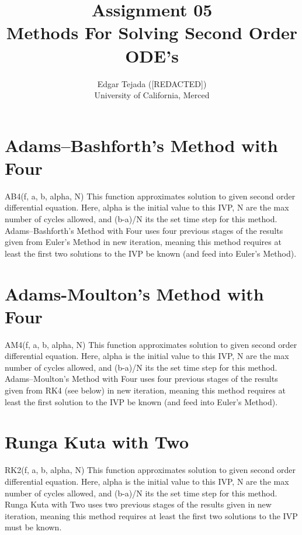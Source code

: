 \documentclass [12pt]{article}
\title{Assignment 05 \\\medskip Methods For Solving Second Order ODE's}
\author{Edgar Tejada ([REDACTED])\\University of California, Merced}
\begin{document}
\maketitle

\newpage
\section{Adams–Bashforth's Method with Four}
\indent AB4(f, a, b, alpha, N)
\indent \indent This function approximates solution to given second order differential equation. Here, alpha is the initial value to this IVP, N are the max number of cycles allowed, and (b-a)/N its the set time step for this method. Adams–Bashforth's Method with Four uses four previous stages of the results given from Euler's Method in new iteration, meaning this method requires at least the first two solutions to the IVP be known (and feed into Euler's Method).

\newpage
\section{Adams-Moulton's Method with Four}
\indent AM4(f, a, b, alpha, N)
\indent \indent This function approximates solution to given second order differential equation. Here, alpha is the initial value to this IVP, N are the max number of cycles allowed, and (b-a)/N its the set time step for this method. Adams–Moulton's Method with Four uses four previous stages of the results given from RK4 (see below) in new iteration, meaning this method requires at least the first solution to the IVP be known (and feed into Euler's Method). 

\newpage
\section{Runga Kuta with Two}
\indent RK2(f, a, b, alpha, N)
\indent \indent This function approximates solution to given second order differential equation. Here, alpha is the initial value to this IVP, N are the max number of cycles allowed, and (b-a)/N its the set time step for this method. Runga Kuta with Two uses two previous stages of the results given in new iteration, meaning this method requires at least the first two solutions to the IVP must be known.
\end{document}
